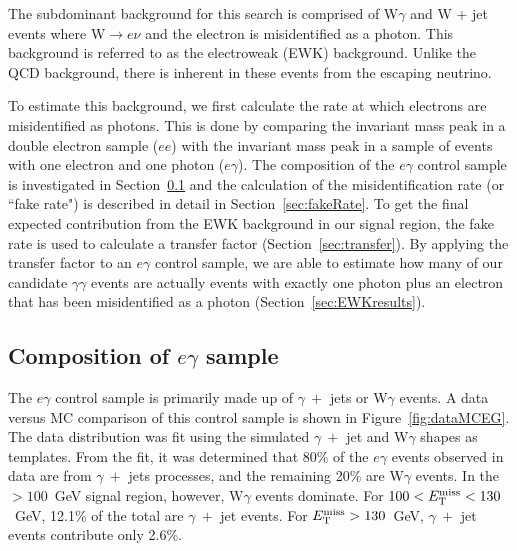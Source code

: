 The subdominant background for this search is comprised of W$\gamma$ and W + jet events where W$\rightarrow e \nu$ and the electron is misidentified as a photon. This background is referred to as the electroweak (EWK) background. Unlike the QCD background, there is inherent \ETmiss in these events from the escaping neutrino. 

To estimate this background, we first calculate the rate at which electrons are misidentified as photons. This is done by comparing the invariant mass peak in a double electron sample ($ee$) with the invariant mass peak in a sample of events with one electron and one photon ($e\gamma$). The composition of the $e\gamma$ control sample is investigated in Section~\ref{sec:EWKMC} and the calculation of the misidentification rate (or ``fake rate") is described in detail in Section~\ref{sec:fakeRate}. To get the final expected contribution from the EWK background in our signal region, the fake rate is used to calculate a transfer factor (Section~\ref{sec:transfer}). By applying the transfer factor to an $e\gamma$ control sample, we are able to estimate how many of our candidate $\gamma\gamma$ events are actually events with exactly one photon plus an electron that has been misidentified as a photon (Section~\ref{sec:EWKresults}). 


\subsection{Composition of $e\gamma$ sample}
\label{sec:EWKMC}
The $e\gamma$ control sample is primarily made up of $\gamma~+$ jets or W$\gamma$ events. A data versus MC comparison of this control sample is shown in Figure~\ref{fig:dataMCEG}. The data distribution was fit using the simulated $\gamma~+$ jet and W$\gamma$ shapes as templates. From the fit, it was determined that 80\% of the $e\gamma$ events observed in data are from $\gamma~+$ jets  processes, and the remaining 20\% are W$\gamma$ events.  
In the \ETmiss$>100$~GeV signal region, however, W$\gamma$ events dominate.
For $100 < E_{\mathrm{T}}^{\text{miss}} < 130$~GeV, 12.1\% of the total are
$\gamma~+$ jet events. For $E_{\mathrm{T}}^{\text{miss}} >130$~GeV, 
$\gamma~+$ jet events contribute only 2.6\%.

